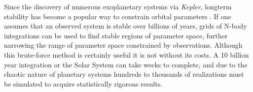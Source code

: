 \documentclass[12pt,letter]{aastex}
\newcommand{\kep}{{\it Kepler}\xspace}
\begin{document}
Since the discovery of numerous exoplanetary systems via \kep, longterm stability has become a popular way to constrain orbital parameters \citep{Lissauer2011, Steffen2013, Jontof-Hutter2014, Tamayo2015}. 
If one assumes that an observed system is stable over billions of years, grids of N-body integrations can be used to find stable regions of parameter space, further narrowing the range of parameter space constrained by observations. 
Although this brute-force method is certainly useful it is not without its costs. 
A 10 billion year integration or the Solar System can take weeks to complete, and due to the chaotic nature of planetary systems hundreds to thousands of realizations must be simulated to acquire statistically rigorous results. 



\end{document}
